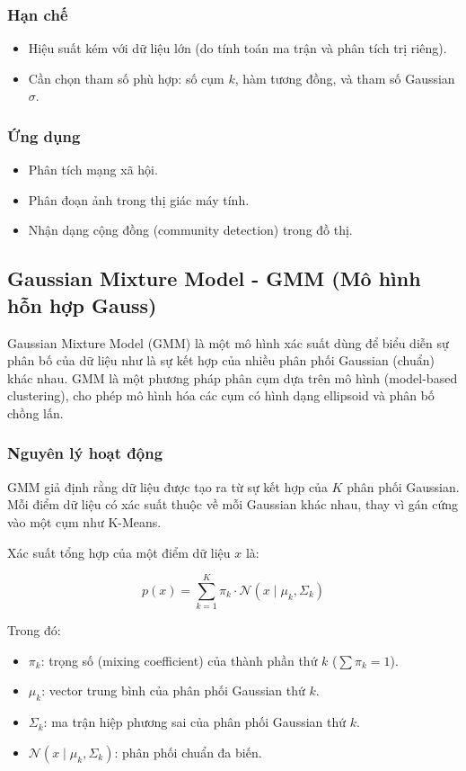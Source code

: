 \subsubsection*{Hạn chế}
\begin{itemize}
    \item Hiệu suất kém với dữ liệu lớn (do tính toán ma trận và phân tích trị riêng).
    \item Cần chọn tham số phù hợp: số cụm $k$, hàm tương đồng, và tham số Gaussian $\sigma$.
\end{itemize}

\subsubsection*{Ứng dụng}
\begin{itemize}
    \item Phân tích mạng xã hội.
    \item Phân đoạn ảnh trong thị giác máy tính.
    \item Nhận dạng cộng đồng (community detection) trong đồ thị.
\end{itemize}

\subsection {Gaussian Mixture Model - GMM (Mô hình hỗn hợp Gauss)}
\label{label:SpectralClustering}

Gaussian Mixture Model (GMM) \cite{bishop2006pattern} là một mô hình xác suất dùng để biểu diễn sự phân bố của dữ liệu như là sự kết hợp của nhiều phân phối Gaussian (chuẩn) khác nhau. GMM là một phương pháp phân cụm dựa trên mô hình (model-based clustering), cho phép mô hình hóa các cụm có hình dạng ellipsoid và phân bố chồng lấn.

\subsubsection*{Nguyên lý hoạt động}

GMM giả định rằng dữ liệu được tạo ra từ sự kết hợp của $K$ phân phối Gaussian. Mỗi điểm dữ liệu có xác suất thuộc về mỗi Gaussian khác nhau, thay vì gán cứng vào một cụm như K-Means.

Xác suất tổng hợp của một điểm dữ liệu $x$ là:

\[
p(x) = \sum_{k=1}^{K} \pi_k \cdot \mathcal{N}(x \mid \mu_k, \Sigma_k)
\]

Trong đó:
\begin{itemize}
    \item $\pi_k$: trọng số (mixing coefficient) của thành phần thứ $k$ ($\sum \pi_k = 1$).
    \item $\mu_k$: vector trung bình của phân phối Gaussian thứ $k$.
    \item $\Sigma_k$: ma trận hiệp phương sai của phân phối Gaussian thứ $k$.
    \item $\mathcal{N}(x \mid \mu_k, \Sigma_k)$: phân phối chuẩn đa biến.
\end{itemize}

